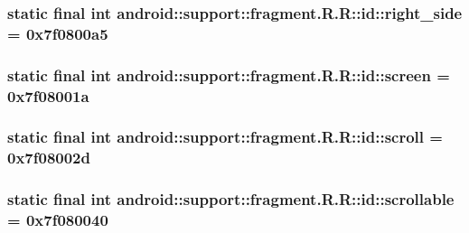 \hypertarget{classandroid_1_1support_1_1fragment_1_1_r_1_1id_2fd5baa05867c49fee68ef8a7b816c4b}{
\subsubsection[{right\_\-side}]{\setlength{\rightskip}{0pt plus 5cm}static final int android::support::fragment.R.R::id::right\_\-side = 0x7f0800a5}}
\label{classandroid_1_1support_1_1fragment_1_1_r_1_1id_2fd5baa05867c49fee68ef8a7b816c4b}


\hypertarget{classandroid_1_1support_1_1fragment_1_1_r_1_1id_51dd7899748902be614e7b6184beb3dd}{
\subsubsection[{screen}]{\setlength{\rightskip}{0pt plus 5cm}static final int android::support::fragment.R.R::id::screen = 0x7f08001a}}
\label{classandroid_1_1support_1_1fragment_1_1_r_1_1id_51dd7899748902be614e7b6184beb3dd}


\hypertarget{classandroid_1_1support_1_1fragment_1_1_r_1_1id_b2ba6fb2dd53682894c99354f0dbb486}{
\subsubsection[{scroll}]{\setlength{\rightskip}{0pt plus 5cm}static final int android::support::fragment.R.R::id::scroll = 0x7f08002d}}
\label{classandroid_1_1support_1_1fragment_1_1_r_1_1id_b2ba6fb2dd53682894c99354f0dbb486}


\hypertarget{classandroid_1_1support_1_1fragment_1_1_r_1_1id_50aac0223ea9c0aeac1ffb1c6de13b89}{
\subsubsection[{scrollable}]{\setlength{\rightskip}{0pt plus 5cm}static final int android::support::fragment.R.R::id::scrollable = 0x7f080040}}
\label{classandroid_1_1support_1_1fragment_1_1_r_1_1id_50aac0223ea9c0aeac1ffb1c6de13b89}


